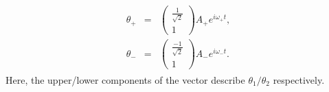 \documentclass[letterpaper,10pt,english]{sphinxmanual}
\begin{document}
\begin{equation*}
\begin{split}
\begin{eqnarray*}
\theta_+&=&\left(\begin{array}{c}
\frac{1}{\sqrt{2}}\\ 1\end{array}\right)A_+e^{i\omega_+t},\\
\theta_-&=&\left(\begin{array}{c}
\frac{-1}{\sqrt{2}}\\ 1\end{array}\right)A_-e^{i\omega_-t}.
\end{eqnarray*}
\end{split}
\end{equation*}
Here, the upper/lower components of the vector describe
\(\theta_1/\theta_2\) respectively.
\end{document}
